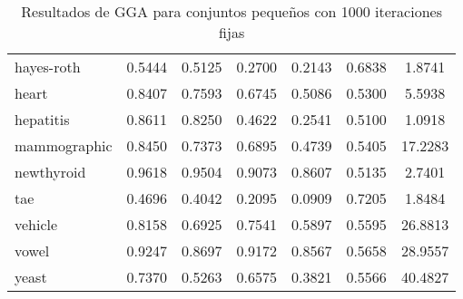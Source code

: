 \begin{table}[]
\begin{tabular}{l c c c c c c}
hayes-roth & 0.5444 & 0.5125 & 0.2700 & 0.2143 & 0.6838 & 1.8741 \\
heart & 0.8407 & 0.7593 & 0.6745 & 0.5086 & 0.5300 & 5.5938 \\
hepatitis & 0.8611 & 0.8250 & 0.4622 & 0.2541 & 0.5100 & 1.0918 \\
mammographic & 0.8450 & 0.7373 & 0.6895 & 0.4739 & 0.5405 & 17.2283 \\
newthyroid & 0.9618 & 0.9504 & 0.9073 & 0.8607 & 0.5135 & 2.7401 \\
tae & 0.4696 & 0.4042 & 0.2095 & 0.0909 & 0.7205 & 1.8484 \\
vehicle & 0.8158 & 0.6925 & 0.7541 & 0.5897 & 0.5595 & 26.8813 \\
vowel & 0.9247 & 0.8697 & 0.9172 & 0.8567 & 0.5658 & 28.9557 \\
yeast & 0.7370 & 0.5263 & 0.6575 & 0.3821 & 0.5566 & 40.4827 \\

\hline
\end{tabular}
\caption{Resultados de GGA para conjuntos pequeños con 1000 iteraciones fijas}
\label{res-peq-gga}
\end{table}



